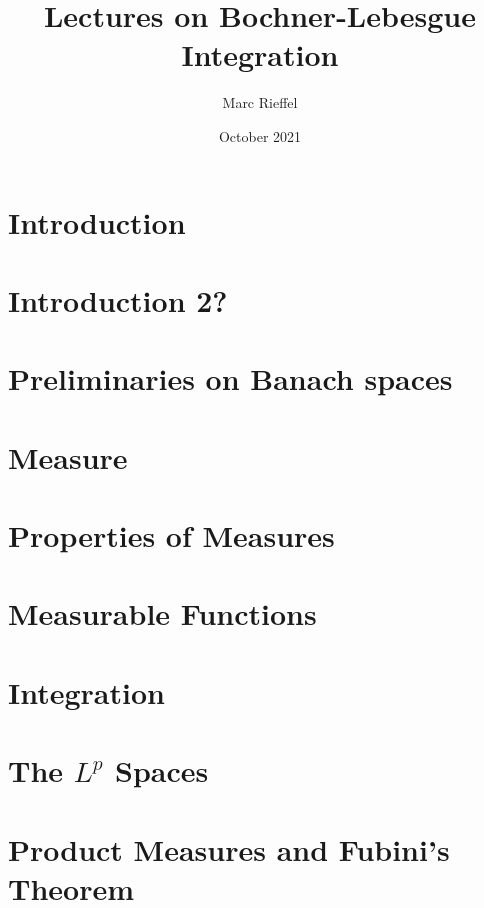 \documentclass[12pt]{book}
\title{Lectures on Bochner-Lebesgue Integration}
\author{Marc Rieffel}
\date{October 2021}
\theoremstyle{definition}
\begin{document}
\maketitle

\setcounter{chapter}{-1}


\chapter*{Introduction}



\chapter*{Introduction 2?}



\tableofcontents

\chapter{Preliminaries on Banach spaces}


\chapter{Measure}


\chapter{Properties of Measures}


\chapter{Measurable Functions}


\chapter{Integration}


\chapter{The $L^p$ Spaces}


\chapter{Product Measures and Fubini's Theorem}


\end{document}
